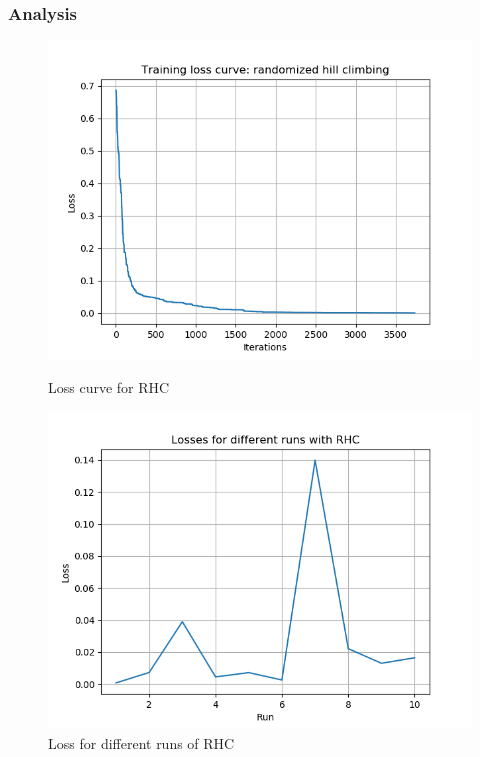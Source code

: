 \documentclass[letterpaper]{article}
\begin{document}
	\subsubsection{Analysis}
	\begin{figure}
		\centering
		\begin{minipage}{.5\textwidth}
			\centering
			\includegraphics[width=\linewidth]{../plots/nn_loss_rhc}
			\caption{Loss curve for RHC}
			\label{fig:rhc_loss}
		\end{minipage}%
		\begin{minipage}{.5\textwidth}
			\centering
			\includegraphics[width=\linewidth]{../plots/nn_runs_rhc}
			\caption{Loss for different runs of RHC}
			\label{fig:rhc_runs}			
		\end{minipage}
	\end{figure}
\end{document}
